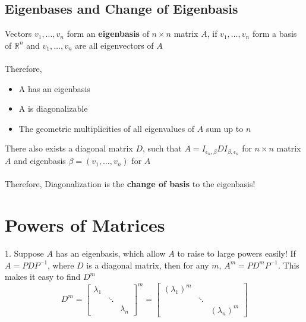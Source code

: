 \begin{enumerate}
\subsection{Eigenbases and Change of Eigenbasis}
Vectors $v_1, \dots, v_n$ form an \textbf{eigenbasis} of $n \times n$ matrix $A$, if $v_1, \dots, v_n$ form a basis of $\mathbb{R}^n$ and $v_1, \dots, 
v_n$ are all eigenvectors of $A$ \\\\ 
Therefore, 
\begin{itemize}
  \item A has an eigenbasis 
  \item A is diagonalizable 
  \item The geometric multiplicities of all eigenvalues of $A$ 
    sum up to $n$ 
\end{itemize}
There also exists a diagonal matrix $D$, such that $A = I_{\epsilon_n, 
\beta}DI_{\beta, \epsilon_n}$ for $n \times n$ matrix $A$ and 
eigenbasis $\beta = (v_1, \dots, v_n)$ for $A$ \\\\
Therefore, Diagonalization is the \textbf{change of basis} to the eigenbasis!
\section{Powers of Matrices}
1. Suppose $A$ has an eigenbasis, which allow $A$ to raise to large 
powers easily! If $A = PDP^{-1}$, where $D$ is a diagonal matrix, 
then for any $m$, $A^m = PD^mP^{-1}$. This makes it easy to find 
$D^m$ 
\[
  D^m = \begin{bmatrix} \lambda_1 & & \\ & \ddots & \\ & & \lambda_n 
    \end{bmatrix}^m = \begin{bmatrix} (\lambda_1)^m & & \\ 
                                                    & \ddots & \\
                                                    & & (\lambda_n)^m
    \end{bmatrix}
\]

\end{enumerate}
